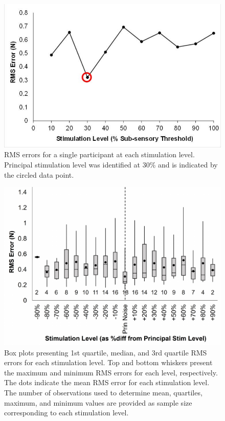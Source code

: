 \documentclass[]{cik}%
\begin{document}
\begin{figure}

{\centering \includegraphics[width=1\textwidth,height=\textheight]{./figures/fig4.pdf}

}

\caption{\label{fig-4}RMS errors for a single participant at each
stimulation level. Principal stimulation level was identified at 30\%
and is indicated by the circled data point.}

\end{figure}

\begin{figure}

{\centering \includegraphics[width=1\textwidth,height=\textheight]{./figures/fig5.pdf}

}

\caption{\label{fig-5}Box plots presenting 1st quartile, median, and 3rd
quartile RMS errors for each stimulation level. Top and bottom whiskers
present the maximum and minimum RMS errors for each level, respectively.
The dots indicate the mean RMS error for each stimulation level. The
number of observations used to determine mean, quartiles, maximum, and
minimum values are provided as sample size corresponding to each
stimulation level.}

\end{figure}
\end{document}
